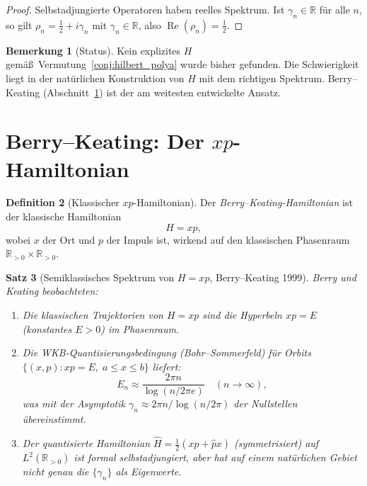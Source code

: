 \documentclass[12pt,a4paper]{amsart}
\newtheorem{theorem}{Satz}[section]
\theoremstyle{definition}
\newtheorem{definition}[theorem]{Definition}
\newtheorem{remark}[theorem]{Bemerkung}
\newcommand{\R}{\mathbb{R}}
\DeclareMathOperator{\Re}{Re}
\begin{document}
\begin{proof}
Selbstadjungierte Operatoren haben reelles Spektrum. Ist $\gamma_n \in \R$
f\"ur alle $n$, so gilt $\rho_n = \tfrac{1}{2} + i\gamma_n$ mit
$\gamma_n \in \R$, also $\Re(\rho_n) = \tfrac{1}{2}$.
\end{proof}

\begin{remark}[Status]
Kein explizites $H$ gem\"a\ss\ Vermutung~\ref{conj:hilbert_polya} wurde bisher
gefunden. Die Schwierigkeit liegt in der nat\"urlichen Konstruktion von $H$
mit dem richtigen Spektrum.
Berry--Keating (Abschnitt~\ref{sec:berry_keating}) ist der am weitesten
entwickelte Ansatz.
\end{remark}

\section{Berry--Keating: Der \texorpdfstring{$xp$}{xp}-Hamiltonian}
\label{sec:berry_keating}

\begin{definition}[Klassischer $xp$-Hamiltonian]
\label{def:xp}
Der \emph{Berry--Keating-Hamiltonian} ist der klassische Hamiltonian
\[
  H = xp,
\]
wobei $x$ der Ort und $p$ der Impuls ist, wirkend auf den klassischen
Phasenraum $\R_{>0} \times \R_{>0}$.
\end{definition}

\begin{theorem}[Semiklassisches Spektrum von $H=xp$, Berry--Keating 1999]
\label{thm:berry_keating}
Berry und Keating \cite{BerryKeating1999} beobachteten:
\begin{enumerate}
  \item[\textup{(i)}] Die klassischen Trajektorien von $H = xp$ sind
    die Hyperbeln $xp = E$ (konstantes $E > 0$) im Phasenraum.
  \item[\textup{(ii)}] Die WKB-Quantisierungsbedingung (Bohr--Sommerfeld)
    f\"ur Orbits $\{(x,p) : xp = E,\; a \le x \le b\}$ liefert:
    \[
      E_n \approx \frac{2\pi n}{\log(n/2\pi e)} \quad (n \to \infty),
    \]
    was mit der Asymptotik $\gamma_n \approx 2\pi n/\log(n/2\pi)$ der
    Nullstellen \"ubereinstimmt.
  \item[\textup{(iii)}] Der quantisierte Hamiltonian
    $\hat H = \tfrac{1}{2}(x\hat p + \hat p x)$
    (symmetrisiert) auf $L^2(\R_{>0})$ ist formal selbstadjungiert,
    aber hat auf einem nat\"urlichen Gebiet nicht genau die $\{\gamma_n\}$
    als Eigenwerte.
\end{enumerate}
\end{theorem}
\end{document}
